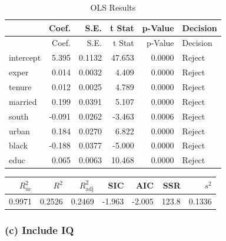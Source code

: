 \documentclass[11pt,]{article}
\newenvironment{Shaded}{\begin{snugshade}}{\end{snugshade}}
\newcommand{\KeywordTok}[1]{\textcolor[rgb]{0.13,0.29,0.53}{\textbf{#1}}}
\newcommand{\DataTypeTok}[1]{\textcolor[rgb]{0.13,0.29,0.53}{#1}}
\newcommand{\DecValTok}[1]{\textcolor[rgb]{0.00,0.00,0.81}{#1}}
\newcommand{\StringTok}[1]{\textcolor[rgb]{0.31,0.60,0.02}{#1}}
\newcommand{\OperatorTok}[1]{\textcolor[rgb]{0.81,0.36,0.00}{\textbf{#1}}}
\newcommand{\NormalTok}[1]{#1}
\begin{document}
\newpage

\begin{Shaded}
\end{Shaded}

\begin{longtable}[]{@{}lrrrrl@{}}
\caption{OLS Results}\tabularnewline
\toprule
& Coef. & S.E. & t Stat & p-Value & Decision\tabularnewline
\midrule
\endfirsthead
\toprule
& Coef. & S.E. & t Stat & p-Value & Decision\tabularnewline
\midrule
\endhead
intercept & 5.395 & 0.1132 & 47.653 & 0.0000 & Reject\tabularnewline
exper & 0.014 & 0.0032 & 4.409 & 0.0000 & Reject\tabularnewline
tenure & 0.012 & 0.0025 & 4.789 & 0.0000 & Reject\tabularnewline
married & 0.199 & 0.0391 & 5.107 & 0.0000 & Reject\tabularnewline
south & -0.091 & 0.0262 & -3.463 & 0.0006 & Reject\tabularnewline
urban & 0.184 & 0.0270 & 6.822 & 0.0000 & Reject\tabularnewline
black & -0.188 & 0.0377 & -5.000 & 0.0000 & Reject\tabularnewline
educ & 0.065 & 0.0063 & 10.468 & 0.0000 & Reject\tabularnewline
\bottomrule
\end{longtable}

\begin{Shaded}
\end{Shaded}

\begin{longtable}[]{@{}rrrrrrr@{}}
\toprule
\(R^2_\text{uc}\) & \(R^2\) & \(R^2_\text{adj}\) & SIC & AIC & SSR &
\(s^2\)\tabularnewline
\midrule
\endhead
0.9971 & 0.2526 & 0.2469 & -1.963 & -2.005 & 123.8 &
0.1336\tabularnewline
\bottomrule
\end{longtable}

\subsubsection{(c) Include IQ}\label{c-include-iq}
\end{document}
